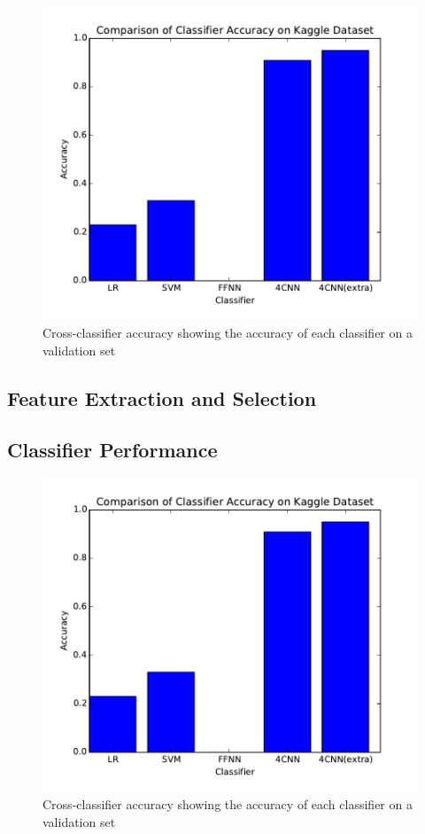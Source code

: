 \documentclass[conference]{IEEEtran}
\begin{document}
\begin{figure}[h]
	\label{crossacc}
	\centering
	\includegraphics[scale=0.6]{cross-classifier-acc.pdf}
	\caption{Cross-classifier accuracy showing the accuracy of each classifier on a validation set}
\end{figure}



\subsection{Feature Extraction and Selection}



\subsection{Classifier Performance}

\begin{figure}[h]
	\label{crossacc}
	\centering
	\includegraphics[scale=0.6]{cross-classifier-acc.pdf}
	\caption{Cross-classifier accuracy showing the accuracy of each classifier on a validation set}
\end{figure}
\end{document}
